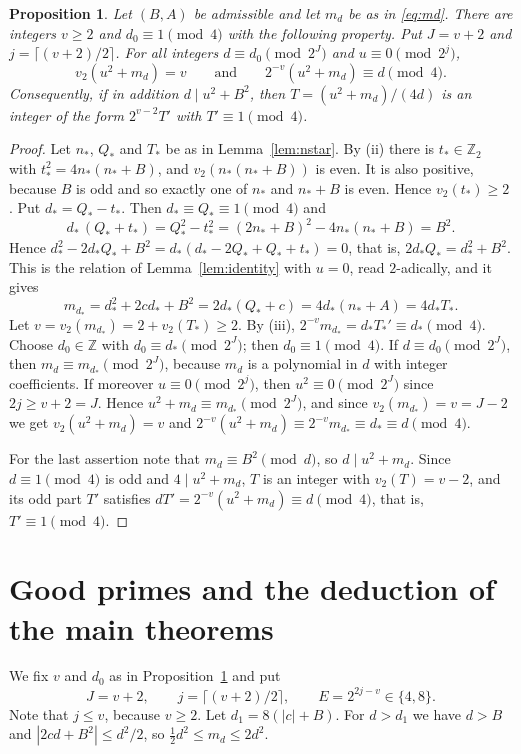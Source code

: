 \documentclass[11pt]{amsart}
\newtheorem{proposition}[theorem]{Proposition}
\theoremstyle{remark}
\theoremstyle{definition}
\numberwithin{equation}{section}
\newcommand{\Z}{\mathbb{Z}}
\newcommand{\Zt}{\mathbb{Z}_2}
\begin{document}
\begin{proposition}\label{prop:seed}
Let $(B,A)$ be admissible and let $m_d$ be as in \eqref{eq:md}. There are integers $v\ge2$ and $d_0\equiv1\pmod4$ with the following property. Put $J=v+2$ and $j=\lceil(v+2)/2\rceil$. For all integers $d\equiv d_0\pmod{2^J}$ and $u\equiv0\pmod{2^j}$,
\[
v_2(u^2+m_d)=v\qquad\text{and}\qquad2^{-v}(u^2+m_d)\equiv d\pmod 4 .
\]
Consequently, if in addition $d\mid u^2+B^2$, then $T=(u^2+m_d)/(4d)$ is an integer of the form $2^{v-2}T'$ with $T'\equiv1\pmod4$.
\end{proposition}

\begin{proof}
Let $n_*$, $Q_*$ and $T_*$ be as in Lemma~\ref{lem:nstar}. By (ii) there is $t_*\in\Zt$ with $t_*^2=4n_*(n_*+B)$, and $v_2(n_*(n_*+B))$ is even. It is also positive, because $B$ is odd and so exactly one of $n_*$ and $n_*+B$ is even. Hence $v_2(t_*)\ge2$. Put $d_*=Q_*-t_*$. Then $d_*\equiv Q_*\equiv1\pmod4$ and
\[
d_*\,(Q_*+t_*)=Q_*^2-t_*^2=(2n_*+B)^2-4n_*(n_*+B)=B^2 .
\]
Hence $d_*^2-2d_*Q_*+B^2=d_*(d_*-2Q_*+Q_*+t_*)=0$, that is, $2d_*Q_*=d_*^2+B^2$. This is the relation of Lemma~\ref{lem:identity} with $u=0$, read $2$-adically, and it gives
\[
m_{d_*}=d_*^2+2cd_*+B^2=2d_*(Q_*+c)=4d_*(n_*+A)=4d_*T_*.
\]
Let $v=v_2(m_{d_*})=2+v_2(T_*)\ge2$. By (iii), $2^{-v}m_{d_*}=d_*T_*'\equiv d_*\pmod 4$. Choose $d_0\in\Z$ with $d_0\equiv d_*\pmod{2^J}$; then $d_0\equiv1\pmod 4$. If $d\equiv d_0\pmod{2^J}$, then $m_d\equiv m_{d_*}\pmod{2^J}$, because $m_d$ is a polynomial in $d$ with integer coefficients. If moreover $u\equiv0\pmod{2^j}$, then $u^2\equiv0\pmod{2^J}$ since $2j\ge v+2=J$. Hence $u^2+m_d\equiv m_{d_*}\pmod{2^J}$, and since $v_2(m_{d_*})=v=J-2$ we get $v_2(u^2+m_d)=v$ and $2^{-v}(u^2+m_d)\equiv2^{-v}m_{d_*}\equiv d_*\equiv d\pmod4$.

For the last assertion note that $m_d\equiv B^2\pmod d$, so $d\mid u^2+m_d$. Since $d\equiv1\pmod 4$ is odd and $4\mid u^2+m_d$, $T$ is an integer with $v_2(T)=v-2$, and its odd part $T'$ satisfies $dT'=2^{-v}(u^2+m_d)\equiv d\pmod4$, that is, $T'\equiv1\pmod 4$.
\end{proof}

\section{Good primes and the deduction of the main theorems}\label{sec:good}

We fix $v$ and $d_0$ as in Proposition~\ref{prop:seed} and put
\begin{equation}\label{eq:JjE}
J=v+2,\qquad j=\lceil(v+2)/2\rceil,\qquad E=2^{2j-v}\in\{4,8\}.
\end{equation}
Note that $j\le v$, because $v\ge2$. Let $d_1=8(|c|+B)$. For $d>d_1$ we have $d>B$ and $|2cd+B^2|\le d^2/2$, so $\frac12d^2\le m_d\le2d^2$.
\end{document}
